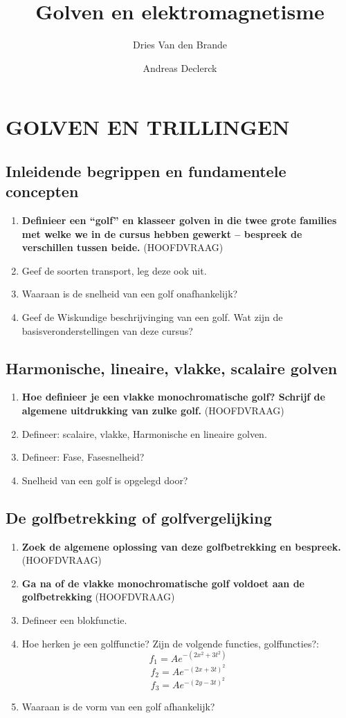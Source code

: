\documentclass[12pt]{article}
\begin{document}
    
    \title{Golven en elektromagnetisme}
    \author{Dries Van den Brande \and Andreas Declerck}
    
    \maketitle
    

    \setcounter{section}{2}
    \section{GOLVEN EN TRILLINGEN}
    \subsection{Inleidende begrippen en fundamentele concepten}
    \begin{enumerate}
        \item \textbf{Definieer een “golf” en klasseer golven in die twee grote families met welke we in de cursus hebben gewerkt – bespreek de verschillen tussen beide.} (HOOFDVRAAG)
        \item Geef de soorten transport, leg deze ook uit.
        \item Waaraan is de snelheid van een golf onafhankelijk?
        \item Geef de Wiskundige beschrijvinging van een golf. Wat zijn de basisveronderstellingen van deze cursus?
    \end{enumerate}
    \subsection{Harmonische, lineaire, vlakke, scalaire golven}
    \begin{enumerate}
        \item \textbf{Hoe definieer je een vlakke monochromatische golf? Schrijf de algemene uitdrukking van zulke golf.} (HOOFDVRAAG)
        \item Defineer: scalaire, vlakke, Harmonische en lineaire golven.
        \item Defineer: Fase, Fasesnelheid?
        \item Snelheid van een golf is opgelegd door?
    \end{enumerate}
    \subsection{De golfbetrekking of golfvergelijking}
    \begin{enumerate}
        \item \textbf{Zoek de algemene oplossing van deze golfbetrekking en bespreek. } (HOOFDVRAAG)
        \item \textbf{Ga na of de vlakke monochromatische golf voldoet aan de golfbetrekking} (HOOFDVRAAG)
        \item Defineer een blokfunctie.
        \item Hoe herken je een golffunctie? Zijn de volgende functies, golffuncties?: 
        $$f_1 = Ae^{-(2x^2+3t^2)}$$ 
        $$f_2 = Ae^{-(2x+3t)^2}$$ 
        $$f_3 = Ae^{-(2y-3t)^2}$$
        \item Waaraan is de vorm van een golf afhankelijk?
    \end{enumerate}
\end{document}
